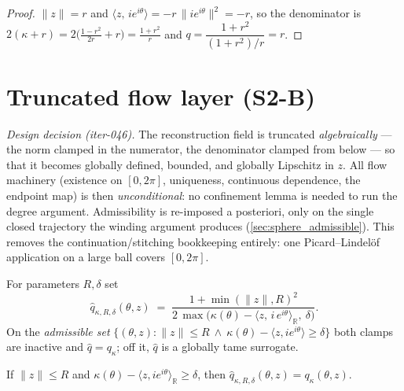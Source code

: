 \begin{proof}

\leanok
  $\|z\|=r$ and $\langle z,\,i e^{i\theta}\rangle=-r\,\|i e^{i\theta}\|^2=-r$, so the
  denominator is $2(\kappa+r)=2\bigl(\tfrac{1-r^2}{2r}+r\bigr)=\tfrac{1+r^2}{r}$ and
  $q=\dfrac{1+r^2}{(1+r^2)/r}=r$.
\end{proof}

\section{Truncated flow layer (S2-B)}
\label{sec:sphere_flow}

\emph{Design decision (iter-046).} The reconstruction field is truncated
\emph{algebraically} — the norm clamped in the numerator, the denominator clamped from
below — so that it becomes globally defined, bounded, and globally Lipschitz in $z$. All
flow machinery (existence on $[0,2\pi]$, uniqueness, continuous dependence, the endpoint
map) is then \emph{unconditional}: no confinement lemma is needed to run the degree
argument. Admissibility is re-imposed a posteriori, only on the single closed trajectory
the winding argument produces (\cref{sec:sphere_admissible}). This removes the
continuation/stitching bookkeeping entirely: one Picard--Lindel\"of application on a
large ball covers $[0,2\pi]$.

\begin{definition}

  \label{def:truncated_speed}
  For parameters $R,\delta$ set
  \[
    \hat q_{\kappa,R,\delta}(\theta,z)\;=\;
      \frac{1+\min(\|z\|,R)^2}
        {2\,\max\bigl(\kappa(\theta)-\langle z,\,i\,e^{i\theta}\rangle_{\mathbb R},\ \delta\bigr)}.
  \]
  On the \emph{admissible set}
  $\{(\theta,z):\|z\|\le R\ \wedge\ \kappa(\theta)-\langle z,i e^{i\theta}\rangle\ge\delta\}$
  both clamps are inactive and $\hat q=q_\kappa$; off it, $\hat q$ is a globally tame
  surrogate.
\end{definition}

\begin{lemma}

  \label{lem:truncated_speed_eq}
  If $\|z\|\le R$ and $\kappa(\theta)-\langle z,i e^{i\theta}\rangle_{\mathbb R}\ge\delta$,
  then $\hat q_{\kappa,R,\delta}(\theta,z)=q_\kappa(\theta,z)$.
\end{lemma}

